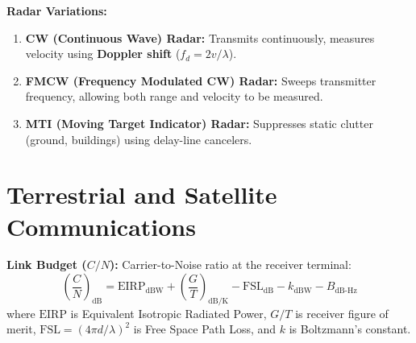 \documentclass[12pt,a4paper]{article}
\begin{document}
\textbf{Radar Variations:}
\begin{enumerate}[leftmargin=*, itemsep=3pt]
  \item \textbf{CW (Continuous Wave) Radar:} Transmits continuously, measures velocity using \textbf{Doppler shift} ($f_d = 2v/\lambda$).
  \item \textbf{FMCW (Frequency Modulated CW) Radar:} Sweeps transmitter frequency, allowing both range and velocity to be measured.
  \item \textbf{MTI (Moving Target Indicator) Radar:} Suppresses static clutter (ground, buildings) using delay-line cancelers.
\end{enumerate}

\section{Terrestrial and Satellite Communications}

\begin{tcolorbox}[tikzbox, title={Satellite Uplink/Downlink Path Schematic}]
\centering
{}
\end{tcolorbox}

\textbf{Link Budget ($C/N$):} Carrier-to-Noise ratio at the receiver terminal:
  \begin{equation}
    \left(\frac{C}{N}\right)_{\text{dB}} = \text{EIRP}_{\text{dBW}} + \left(\frac{G}{T}\right)_{\text{dB/K}} - \text{FSL}_{\text{dB}} - k_{\text{dBW}} - B_{\text{dB-Hz}}
  \end{equation}
  where $\text{EIRP}$ is Equivalent Isotropic Radiated Power, $G/T$ is receiver figure of merit, $\text{FSL} = (4\pi d/\lambda)^2$ is Free Space Path Loss, and $k$ is Boltzmann's constant.
\end{document}
